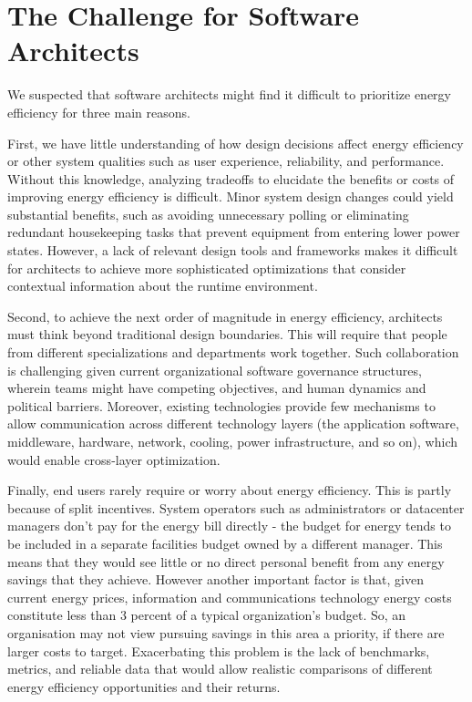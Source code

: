 \section{The Challenge for Software Architects}

We suspected that software architects might find it difficult to prioritize energy efficiency for three main reasons. 

First, we have little understanding of how design decisions affect energy efficiency or other system qualities such as user experience, reliability, and performance. Without this knowledge, analyzing tradeoffs to elucidate the benefits or costs of improving energy efficiency is difficult. Minor system design changes could yield substantial benefits, such as avoiding unnecessary polling or eliminating redundant housekeeping tasks that prevent equipment from entering lower power states. However, a lack of relevant design tools and frameworks makes it difficult for architects to achieve more sophisticated optimizations that consider contextual information about the runtime environment.

Second, to achieve the next order of magnitude in energy efficiency, architects must think beyond traditional design boundaries. This will require that people from different specializations and departments work together. Such collaboration is challenging given current organizational software governance structures, wherein teams might have competing objectives, and human dynamics and political barriers. Moreover, existing technologies provide few mechanisms to allow communication across different technology layers (the application software, middleware, hardware, network, cooling, power infrastructure, and so on), which would enable cross-layer optimization.

Finally, end users rarely require or worry about energy efficiency. This is partly because of split incentives. System operators such as administrators or datacenter managers don't pay for the energy bill directly - the budget for energy tends to be included in a separate facilities budget owned by a different manager. This means that they would see little or no direct personal benefit from any energy savings that they achieve. However another important factor is that, given current energy prices, information and communications technology energy costs constitute less than 3 percent of a typical organization's budget. So, an organisation may not view pursuing savings in this area a priority, if there are larger costs to target. Exacerbating this problem is the lack of benchmarks, metrics, and reliable data that would allow realistic comparisons of different energy efficiency opportunities and their returns.

